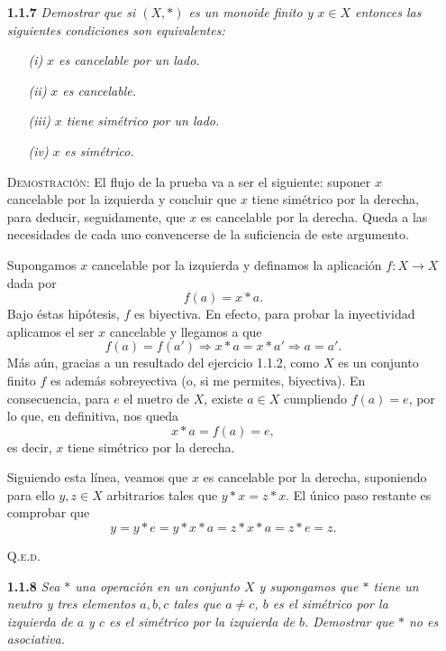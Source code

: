 \documentclass{article}
\begin{document}
\begin{enumerate}
    \item[\textbf{1.1.7}] \textit{Demostrar que si $(X, *)$ es un monoide finito y $x \in X$ entonces las siguientes condiciones son equivalentes:}

    \begin{itemize}
        \item[\textit{(i)}] \textit{$x$ es cancelable por un lado.}
        \item[\textit{(ii)}] \textit{$x$ es cancelable.}
        \item[\textit{(iii)}] \textit{$x$ tiene simétrico por un lado.}
        \item[\textit{(iv)}] \textit{$x$ es simétrico.}
    \end{itemize}

    \vspace{7px}

    \textsc{Demostración}: El flujo de la prueba va a ser el siguiente: suponer $x$ cancelable por la izquierda y concluir que $x$ tiene simétrico por la derecha, para deducir, seguidamente, que $x$ es cancelable por la derecha. Queda a las necesidades de cada uno convencerse de la suficiencia de este argumento.

    Supongamos $x$ cancelable por la izquierda y definamos la aplicación $f : X \to X$ dada por \[f(a) = x * a.\] Bajo éstas hipótesis, $f$ es biyectiva. En efecto, para probar la inyectividad aplicamos el ser $x$ cancelable y llegamos a que \[f(a) = f(a') \Rightarrow x * a = x * a' \Rightarrow a = a'.\] Más aún, gracias a un resultado del ejercicio 1.1.2, como $X$ es un conjunto finito $f$ es además sobreyectiva (o, si me permites, biyectiva). 
    En consecuencia, para $e$ el nuetro de $X$, existe $a \in X$ cumpliendo $f(a) = e$, por lo que, en definitiva, nos queda \[x * a = f(a) = e,\] es decir, $x$ tiene simétrico por la derecha.

    Siguiendo esta línea, veamos que $x$ es cancelable por la derecha, suponiendo para ello $y, z \in X$ arbitrarios tales que $y * x = z * x$. El único paso restante es comprobar que \[y = y * e = y * x * a = z * x * a = z * e = z.\]

    \hfill{\textsc{Q.e.d.}}

    \vspace{12px}

    \item[\textbf{1.1.8}] \textit{Sea $*$ una operación en un conjunto $X$ y supongamos que $*$ tiene un neutro y tres elementos $a, b, c$ tales que $a \neq c$, $b$ es el simétrico por la izquierda de $a$ y $c$ es el simétrico por la izquierda de $b$. Demostrar que $*$ no es asociativa.}


\end{enumerate}
\end{document}
